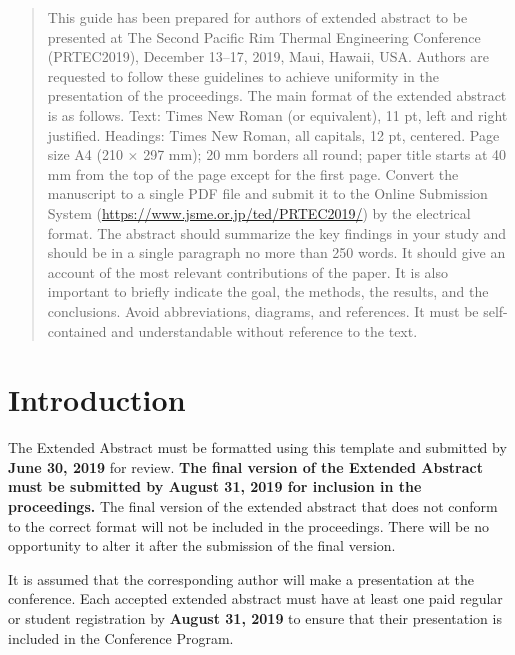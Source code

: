 \documentclass[upint,varvw]{prtec}
\begin{document}
\begin{abstract}

This guide has been prepared for authors of extended abstract to be presented at The Second Pacific Rim Thermal Engineering Conference (PRTEC2019), December 13--17, 2019, Maui, Hawaii, USA. Authors are requested to follow these guidelines to achieve uniformity in the presentation of the proceedings. The main format of the extended abstract is as follows. Text: Times New Roman (or equivalent), 11 pt, left and right justified. Headings: Times New Roman, all capitals, 12 pt, centered. Page size A4 (210 $\times$ 297 mm); 20 mm borders all round; paper title starts at 40 mm from the top of the page except for the first page. Convert the manuscript to a single PDF file and submit it to the Online Submission System (\url{https://www.jsme.or.jp/ted/PRTEC2019/}) by the electrical format. The abstract should summarize the key findings in your study and should be in a single paragraph no more than 250 words. It should give an account of the most relevant contributions of the paper. It is also important to briefly indicate the goal, the methods, the results, and the conclusions. Avoid abbreviations, diagrams, and references. It must be self-contained and understandable without reference to the text.


\end{abstract}


\section{Introduction }

The Extended Abstract must be formatted using this template and submitted by \textbf{June 30, 2019} for review. \textbf{The final version of the Extended Abstract must be submitted by August 31, 2019 for inclusion in the proceedings.} The final version of the extended abstract that does not conform to the correct format will not be included in the proceedings. There will be no opportunity to alter it after the submission of the final version.

It is assumed that the corresponding author will make a presentation at the conference. Each accepted extended abstract must have at least one paid regular or student registration by \textbf{August 31, 2019} to ensure that their presentation is included in the Conference Program. 
\end{document}

